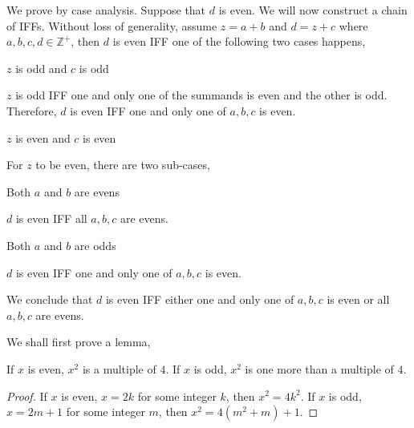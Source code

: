 \begin{pr}\leavevmode
    \begin{enumerate}[label=\textbf{(\alph*)}]
        \item We prove by case analysis. Suppose that $d$ is even. We will now
        construct a chain of IFFs. Without loss of generality, assume $z = a + b$
        and $d = z + c$ where $a,b,c,d \in \mathbb{Z}^{+}$, then $d$ is even IFF
        one of the following two cases happens,

        \begin{casesp}
            \item $z$ is odd and $c$ is odd
            
            $z$ is odd IFF one and only one of the summands is even and the other is odd.
            Therefore, $d$ is even IFF one and only one of $a,b,c$ is even.

            \item $z$ is even and $c$ is even
            
            For $z$ to be even, there are two sub-cases,

            \begin{casesp}
                \item Both $a$ and $b$ are evens
                
                $d$ is even IFF all $a,b,c$ are evens.
                \item Both $a$ and $b$ are odds
                
                $d$ is even IFF one and only one of $a,b,c$ is even.
            \end{casesp}
        \end{casesp}

        We conclude that $d$ is even IFF either one and only one of $a,b,c$
        is even or all $a,b,c$ are evens.

        \item We shall first prove a lemma,
        
        \begin{lemPr}
            If $x$ is even, $x^2$ is a multiple of $4$.
            If $x$ is odd, $x^2$ is one more than a multiple of $4$.
        \end{lemPr}
        \begin{proof}
            If $x$ is even, $x = 2k$ for some integer $k$, then $x^2 = 4k^2$.
            If $x$ is odd, $x = 2m + 1$ for some integer $m$, then $x^2 = 4(m^2 + m) + 1$.
        \end{proof}


\end{enumerate}
\end{pr}

